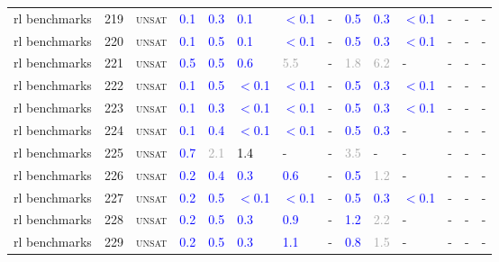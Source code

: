 \begin{center}
{\begin{longtable}{@{}llllllllllllll@{}}
rl benchmarks & 219 & \textsc{unsat} & \textcolor{blue}{0.1} & \textcolor{blue}{0.3} & \textcolor{blue}{0.1} & \textcolor{blue}{$<$0.1} & - & \textcolor{blue}{0.5} & \textcolor{blue}{0.3} & \textcolor{blue}{$<$0.1} & - & - & - \\
rl benchmarks & 220 & \textsc{unsat} & \textcolor{blue}{0.1} & \textcolor{blue}{0.5} & \textcolor{blue}{0.1} & \textcolor{blue}{$<$0.1} & - & \textcolor{blue}{0.5} & \textcolor{blue}{0.3} & \textcolor{blue}{$<$0.1} & - & - & - \\
rl benchmarks & 221 & \textsc{unsat} & \textcolor{blue}{0.5} & \textcolor{blue}{0.5} & \textcolor{blue}{0.6} & \textcolor{darkgray}{5.5} & - & \textcolor{darkgray}{1.8} & \textcolor{darkgray}{6.2} & - & - & - & - \\
rl benchmarks & 222 & \textsc{unsat} & \textcolor{blue}{0.1} & \textcolor{blue}{0.5} & \textcolor{blue}{$<$0.1} & \textcolor{blue}{$<$0.1} & - & \textcolor{blue}{0.5} & \textcolor{blue}{0.3} & \textcolor{blue}{$<$0.1} & - & - & - \\
rl benchmarks & 223 & \textsc{unsat} & \textcolor{blue}{0.1} & \textcolor{blue}{0.3} & \textcolor{blue}{$<$0.1} & \textcolor{blue}{$<$0.1} & - & \textcolor{blue}{0.5} & \textcolor{blue}{0.3} & \textcolor{blue}{$<$0.1} & - & - & - \\
rl benchmarks & 224 & \textsc{unsat} & \textcolor{blue}{0.1} & \textcolor{blue}{0.4} & \textcolor{blue}{$<$0.1} & \textcolor{blue}{$<$0.1} & - & \textcolor{blue}{0.5} & \textcolor{blue}{0.3} & - & - & - & - \\
rl benchmarks & 225 & \textsc{unsat} & \textcolor{blue}{0.7} & \textcolor{darkgray}{2.1} & \textcolor{black}{1.4} & - & - & \textcolor{darkgray}{3.5} & - & - & - & - & - \\
rl benchmarks & 226 & \textsc{unsat} & \textcolor{blue}{0.2} & \textcolor{blue}{0.4} & \textcolor{blue}{0.3} & \textcolor{blue}{0.6} & - & \textcolor{blue}{0.5} & \textcolor{darkgray}{1.2} & - & - & - & - \\
rl benchmarks & 227 & \textsc{unsat} & \textcolor{blue}{0.2} & \textcolor{blue}{0.5} & \textcolor{blue}{$<$0.1} & \textcolor{blue}{$<$0.1} & - & \textcolor{blue}{0.5} & \textcolor{blue}{0.3} & \textcolor{blue}{$<$0.1} & - & - & - \\
rl benchmarks & 228 & \textsc{unsat} & \textcolor{blue}{0.2} & \textcolor{blue}{0.5} & \textcolor{blue}{0.3} & \textcolor{blue}{0.9} & - & \textcolor{blue}{1.2} & \textcolor{darkgray}{2.2} & - & - & - & - \\
rl benchmarks & 229 & \textsc{unsat} & \textcolor{blue}{0.2} & \textcolor{blue}{0.5} & \textcolor{blue}{0.3} & \textcolor{blue}{1.1} & - & \textcolor{blue}{0.8} & \textcolor{darkgray}{1.5} & - & - & - & - \\

\end{longtable}}
\end{center}
